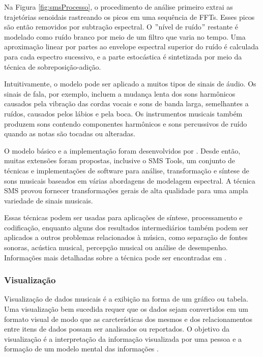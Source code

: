 Na Figura \ref{fig:smsProcesso}, o procedimento de análise primeiro extrai as trajetórias senoidais rastreando os picos em uma sequência de FFTs. Esses picos são então removidos por subtração espectral. O $"$nível de ruído$"$ restante é modelado como ruído branco por meio de um filtro que varia no tempo. Uma aproximação linear por partes ao envelope espectral superior do ruído é calculada para cada espectro sucessivo, e a parte estocástica é sintetizada por meio da técnica de sobreposição-adição.

Intuitivamente, o modelo pode ser aplicado a muitos tipos de sinais de áudio. Os sinais de fala, por exemplo, incluem a mudança lenta dos sons harmônicos causados pela vibração das cordas vocais e sons de banda larga, semelhantes a ruídos, causados pelos lábios e pela boca. Os instrumentos musicais também produzem sons contendo componentes harmônicos e sons percussivos de ruído quando as notas são tocadas ou alteradas.

O modelo básico e a implementação foram desenvolvidos por . Desde então, muitas extensões foram propostas, inclusive o SMS Tools, um conjunto de técnicas e implementações de software para análise, transformação e síntese de sons musicais baseados em várias abordagens de modelagem espectral. A técnica SMS provou fornecer transformações gerais de alta qualidade para uma ampla variedade de sinais musicais.

Essas técnicas podem ser usadas para aplicações de síntese, processamento e codificação, enquanto alguns dos resultados intermediários também podem ser aplicados a outros problemas relacionados à música, como separação de fontes sonoras, acústica musical, percepção musical ou análise de desempenho. Informações mais detalhadas sobre a técnica pode ser encontradas em \cite{serra1990}.

\subsubsection{Visualização} \label{subsubsec:visualizacao}
Visualização de dados musicais é a exibição na forma de um gráfico ou tabela. Uma visualização bem sucedida requer que os dados sejam convertidos em um formato visual de modo que as carcterísticas dos mesmos e dos relacionamentos entre itens de dados possam ser analisados ou reportados. O objetivo da visualização é a interpretação da informação visualizada por uma pessoa e a formação de um modelo mental das informações \cite{pang2009}.

